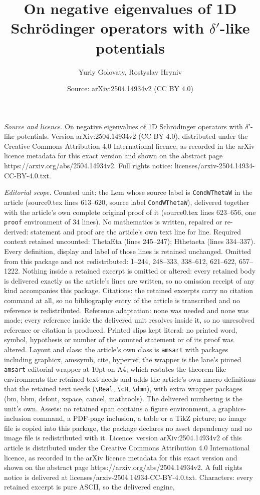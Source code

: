 \documentclass[10pt,a4paper]{amsart}
\title[On negative eigenvalues of 1D Schr\"{o}dinger operators with]{On negative eigenvalues of 1D Schr\"{o}dinger operators with $\delta'$-like potentials}
\author{Yuriy Golovaty, Rostyslav Hryniv}
\date{Source: arXiv:2504.14934v2 (CC BY 4.0)}
\begin{document}
\maketitle

\noindent\emph{Source and licence.} On negative eigenvalues of 1D Schr\"{o}dinger operators with $\delta'$-like potentials. Version arXiv:2504.14934v2 (CC BY 4.0), distributed under the Creative Commons Attribution 4.0 International licence, as recorded in the arXiv licence metadata for this exact version and shown on the abstract page https://arxiv.org/abs/2504.14934v2. Full rights notice: licenses/arxiv-2504.14934-CC-BY-4.0.txt.\par\smallskip

\noindent\textit{Editorial scope.} Counted unit: the Lem whose source label is \texttt{CondWThetaW} in the article (source0.tex lines 613--620, source label \texttt{CondWThetaW}), delivered together with the article's own complete original proof of it (source0.tex lines 623--656, one \texttt{proof} environment of 34 lines). No mathematics is written, repaired or re-derived: statement and proof are the article's own text line for line. Required context retained uncounted: ThetaEta (lines 245--247); Hthetaeta (lines 334--337). Every definition, display and label of those lines is retained unchanged. Omitted from this package and not redistributed: 1--244, 248--333, 338--612, 621--622, 657--1222. Nothing inside a retained excerpt is omitted or altered: every retained body is delivered exactly as the article's lines are written, so no omission receipt of any kind accompanies this package. Citations: the retained excerpts carry no citation command at all, so no bibliography entry of the article is transcribed and no reference is redistributed. Reference adaptation: none was needed and none was made; every reference inside the delivered unit resolves inside it, so no unresolved reference or citation is produced. Printed slips kept literal: no printed word, symbol, hypothesis or number of the counted statement or of its proof was altered. Layout and class: the article's own class is \texttt{amsart} with packages including graphicx, amssymb, cite, hyperref; the wrapper is the lane's pinned \texttt{amsart} editorial wrapper at 10pt on A4, which restates the theorem-like environments the retained text needs and adds the article's own macro definitions that the retained text needs (\texttt{\textbackslash Real}, \texttt{\textbackslash cH}, \texttt{\textbackslash dmn}), with extra wrapper packages (bm, bbm, dsfont, xspace, cancel, mathtools). The delivered numbering is the unit's own. Assets: no retained span contains a figure environment, a graphics-inclusion command, a PDF-page inclusion, a table or a TikZ picture; no image file is copied into this package, the package declares no asset dependency and no image file is redistributed with it. Licence: version arXiv:2504.14934v2 of this article is distributed under the Creative Commons Attribution 4.0 International licence, as recorded in the arXiv licence metadata for this exact version and shown on the abstract page https://arxiv.org/abs/2504.14934v2. A full rights notice is delivered at licenses/arxiv-2504.14934-CC-BY-4.0.txt. Characters: every retained excerpt is pure ASCII, so the delivered engine, 
\end{document}
